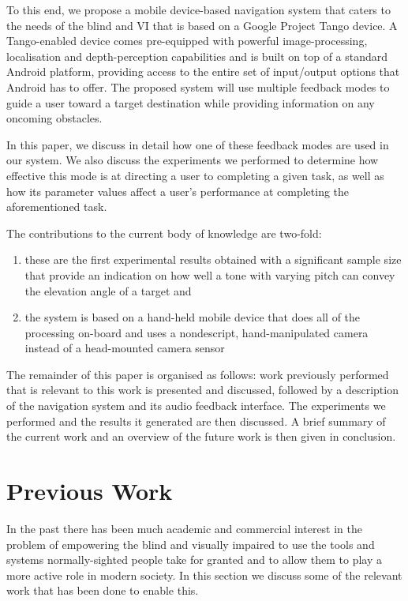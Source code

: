 \documentclass[format=sigconf, review=true, screen=true, anonymous=true]{acmart}
\begin{document}
To this end, we propose a mobile device-based navigation system that caters to the needs of the blind and VI that is based on a Google Project Tango device. A Tango-enabled device comes pre-equipped with powerful image-processing, localisation and depth-perception capabilities and is built on top of a standard Android platform, providing access to the entire set of input/output options that Android has to offer. The proposed system will use multiple feedback modes to guide a user toward a target destination while providing information on any oncoming obstacles.

In this paper, we discuss in detail how one of these feedback modes are used in our system. We also discuss the experiments we performed to determine how effective this mode is at directing a user to completing a given task, as well as how its parameter values affect a user's performance at completing the aforementioned task. 

The contributions to the current body of knowledge are two-fold: 

\begin{enumerate}
  \item these are the first experimental results obtained with a significant sample size that provide an indication on how well a tone with varying pitch can convey the elevation angle of a target and 
  \item the system is based on a hand-held mobile device that does all of the processing on-board and uses a nondescript, hand-manipulated camera instead of a head-mounted camera sensor 
\end{enumerate}

The remainder of this paper is organised as follows: work previously performed that is relevant to this work is presented and discussed, followed by a description of the navigation system and its audio feedback interface. The experiments we performed and the results it generated are then discussed. A brief summary of the current work and an overview of the future work is then given in conclusion. 

\section{Previous Work}

In the past there has been much academic and commercial interest in the problem of empowering the blind and visually impaired to use the tools and systems normally-sighted people take for granted and to allow them to play a more active role in modern society. In this section we discuss some of the relevant work that has been done to enable this. 
\end{document}
